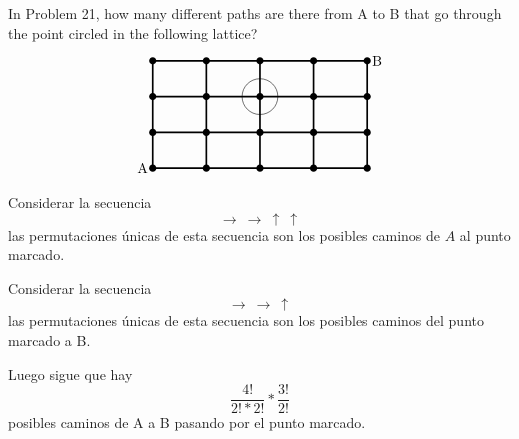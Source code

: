 \item In Problem 21, how many different paths are there from A to B that go through the point circled in the following lattice?
\[
\begin{tikzpicture}[scale=0.9]
    \draw[very thick, xstep=1.5] (0, 0) grid (6, 3);
    \foreach \i in {0, 1.5, ..., 6} {
        \foreach \j in {0, 1, 2, 3} {
            \fill (\i, \j) circle (0.1);
        }
    }
    \node[anchor=east] at (0, 0) {A};
    \node[anchor=west] at (6, 3) {B};
    \draw (3, 2) circle (0.5);
\end{tikzpicture}
\]

Considerar la secuencia
\[ \rightarrow\ \rightarrow\ \uparrow\ \uparrow \]
las permutaciones únicas de esta secuencia son los posibles caminos de $A$ al punto marcado.

Considerar la secuencia
\[ \rightarrow\ \rightarrow\ \uparrow \]
las permutaciones únicas de esta secuencia son los posibles caminos del punto marcado a B.

Luego sigue que hay
\[ \frac{4!}{2! * 2!} * \frac{3!}{2!} \]
posibles caminos de A a B pasando por el punto marcado.